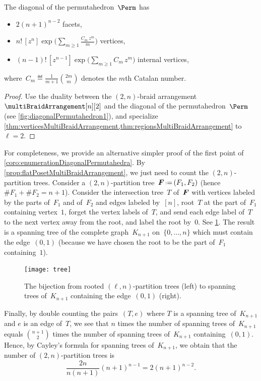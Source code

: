 \begin{corollary}
\label{coro:enumerationDiagonalPermutahedra}
The diagonal of the permutahedron~$\Perm$ has 
\begin{itemize}
\item $2 (n + 1)^{n-2}$ facets,
\item $\displaystyle n! \, [z^n] \exp \bigg( \sum_{m \ge 1} \frac{C_m \, z^m}{m} \bigg)$ vertices,
\item $\displaystyle (n-1)! \, [z^{n-1}] \exp \bigg( \sum_{m \ge 1} C_m \, z^m \bigg)$ internal vertices,
\end{itemize}
where~$\displaystyle C_m \eqdef \frac{1}{m+1} \binom{2m}{m}$ denotes the $m$th Catalan number.
\end{corollary}

\begin{proof}
Use the duality between the $(2,n)$-braid arrangement~$\multiBraidArrangement[n][2]$ and the diagonal of the permutahedron~$\Perm$ (see \cref{fig:diagonalPermutahedron1}), and specialize \cref{thm:verticesMultiBraidArrangement,thm:regionsMultiBraidArrangement} to~$\ell = 2$.
\end{proof}

\begin{remark}
For completeness, we provide an alternative simpler proof of the first point of \cref{coro:enumerationDiagonalPermutahedra}.
By \cref{prop:flatPosetMultiBraidArrangement}, we just need to count the $(2,n)$-partition trees.
Consider a $(2,n)$-partition tree~$\b{F} \eqdef (F_1,F_2)$ (hence~$\# F_1 + \# F_2 = n + 1$).
Consider the intersection tree~$T$ of~$\boldsymbol{F}$ with vertices labeled by the parts of~$F_1$ and of~$F_2$ and edges labeled by~$[n]$, root~$T$ at the part of~$F_1$ containing vertex~$1$, forget the vertex labels of~$T$, and send each edge label of~$T$ to the next vertex away from the root, and label the root by~$0$.
See \cref{fig:tree}.
The result is a spanning tree of the complete graph~$K_{n+1}$ on~$\{0, \dots, n\}$ which must contain the edge~$(0,1)$ (because we have chosen the root to be the part of~$F_1$ containing~$1$).
%
\begin{figure}
	\centerline{\texttt{[image: tree]}}
	\caption{The bijection from rooted $(\ell,n)$-partition trees (left) to spanning trees of~$K_{n+1}$ containing the edge~$(0,1)$ (right).}
	\label{fig:tree}
\end{figure}
%
Finally, by double counting the pairs~$(T,e)$ where $T$ is a spanning tree of~$K_{n+1}$ and $e$ is an edge of~$T$, we see that $n$ times the number of spanning trees of~$K_{n+1}$ equals $\binom{n+1}{2}$ times the number of spanning trees of~$K_{n+1}$ containing~$(0,1)$.
Hence, by Cayley's formula for spanning trees of~$K_{n+1}$, we obtain that the number of $(2,n)$-partition trees is
\[
\frac{2n}{n(n+1)} (n+1)^{n-1} = 2 (n + 1)^{n-2}.
\]
\end{remark}
